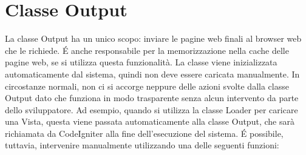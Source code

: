 \section{Classe Output}
\label{class:output}

La classe Output ha un unico scopo: inviare le pagine web finali al browser web che le richiede. \'E anche responsabile per la memorizzazione nella cache delle pagine web, se si utilizza questa funzionalità. La classe viene inizializzata automaticamente dal sistema, quindi non deve essere caricata manualmente. In circostanze normali, non ci si accorge neppure delle azioni svolte dalla classe Output dato che funziona in modo trasparente senza alcun intervento da parte dello sviluppatore. Ad esempio, quando si utilizza la classe Loader per caricare una Vista, questa viene passata automaticamente alla classe Output, che sarà richiamata da CodeIgniter alla fine dell'esecuzione del sistema. \'E possibile, tuttavia, intervenire manualmente utilizzando una delle seguenti funzioni:

